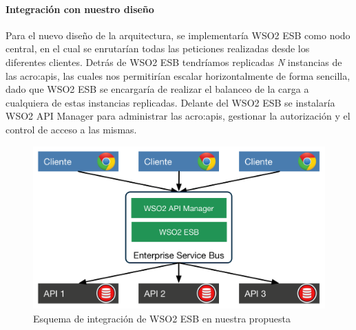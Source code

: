 \paragraph{Integración con nuestro diseño}

Para el nuevo diseño de la arquitectura, se implementaría WSO2 ESB como nodo central, en el cual se enrutarían todas las peticiones realizadas desde los diferentes clientes.  Detrás de WSO2 ESB tendríamos replicadas \textit{N} instancias de las \glspl{acro:api}, las cuales nos permitirían escalar horizontalmente de forma sencilla, dado que WSO2 ESB se encargaría de realizar el balanceo de la carga a cualquiera de estas instancias replicadas.  Delante del WSO2 ESB se instalaría WSO2 API Manager para administrar las \glspl{acro:api}, gestionar la autorización y el control de acceso a las mismas.

\begin{figure}[H]
  \includegraphics[width=\linewidth]{src/images/03-capitulo-3/tecnologias/wso2/wso2-esb-integracion-arquitectura.png}
  \caption{Esquema de integración de WSO2 ESB en nuestra propuesta}
  \label{fig:integracion-wso2-esb-arquitectura}
\end{figure}

